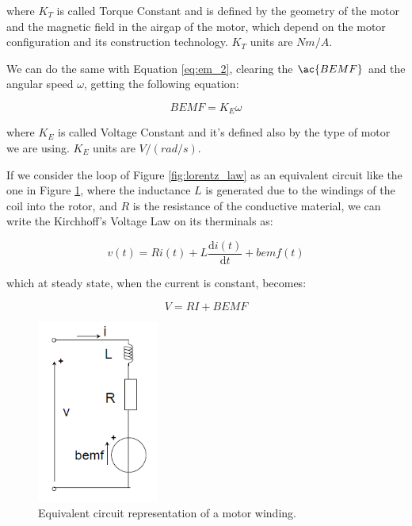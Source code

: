 where $K_{T}$ is called Torque Constant and is defined by the geometry of the motor and the magnetic field in the airgap of the motor, which depend on the motor configuration and its construction technology. $K_{T}$ units are $Nm/A$.

We can do the same with Equation \ref{eq:em_2}, clearing the $\ac{BEMF}$ and the angular speed $\omega$, getting the following equation:

\begin{equation}
	\label{eq:ke}
	BEMF = K_{E} \omega
\end{equation}

where $K_{E}$ is called Voltage Constant and it's defined also by the type of motor we are using. $K_{E}$ units are $V/(rad/s)$.

If we consider the loop of Figure \ref{fig:lorentz_law} as an equivalent circuit like the one in Figure \ref{fig:eq_motor}, where the inductance $L$ is generated due to the windings of the coil into the rotor, and $R$ is the resistance of the conductive material, we can write the Kirchhoff's Voltage Law on its therminals as:

\begin{equation} 
	\label{eq:KVL_coil_time}
	v(t) = R i(t) + L  \frac{\mathrm{d} i(t)}{\mathrm{d} t} + bemf(t)
\end{equation}

which at steady state, when the current is constant, becomes:

\begin{equation}
	\label{eq:KVL_coil}
	V = R I + BEMF
\end{equation}

\begin{figure}[htbp]
\centering
\includegraphics[width=4cm]{Images/eq_motor.png} 
\caption[DC Motor Electrical Model]{Equivalent circuit representation of a motor winding.}
\label{fig:eq_motor}
\end{figure}

